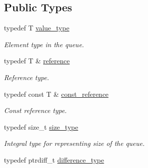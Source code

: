 \subsection*{Public Types}
\begin{DoxyCompactItemize}
\item 
\hypertarget{classtbb_1_1strict__ppl_1_1concurrent__queue_aeeee93a7ac2eecc80bbf3e857e900538}{}typedef T \hyperlink{classtbb_1_1strict__ppl_1_1concurrent__queue_aeeee93a7ac2eecc80bbf3e857e900538}{value\+\_\+type}\label{classtbb_1_1strict__ppl_1_1concurrent__queue_aeeee93a7ac2eecc80bbf3e857e900538}

\begin{DoxyCompactList}\small\item\em Element type in the queue. \end{DoxyCompactList}\item 
\hypertarget{classtbb_1_1strict__ppl_1_1concurrent__queue_ab26ddf11b15d61ac87e6c1ae67af92a2}{}typedef T \& \hyperlink{classtbb_1_1strict__ppl_1_1concurrent__queue_ab26ddf11b15d61ac87e6c1ae67af92a2}{reference}\label{classtbb_1_1strict__ppl_1_1concurrent__queue_ab26ddf11b15d61ac87e6c1ae67af92a2}

\begin{DoxyCompactList}\small\item\em Reference type. \end{DoxyCompactList}\item 
\hypertarget{classtbb_1_1strict__ppl_1_1concurrent__queue_a478c2b7f763b2e821e01cc14e13baf4c}{}typedef const T \& \hyperlink{classtbb_1_1strict__ppl_1_1concurrent__queue_a478c2b7f763b2e821e01cc14e13baf4c}{const\+\_\+reference}\label{classtbb_1_1strict__ppl_1_1concurrent__queue_a478c2b7f763b2e821e01cc14e13baf4c}

\begin{DoxyCompactList}\small\item\em Const reference type. \end{DoxyCompactList}\item 
\hypertarget{classtbb_1_1strict__ppl_1_1concurrent__queue_a9f883e49afea16293ba92da779981bb8}{}typedef size\+\_\+t \hyperlink{classtbb_1_1strict__ppl_1_1concurrent__queue_a9f883e49afea16293ba92da779981bb8}{size\+\_\+type}\label{classtbb_1_1strict__ppl_1_1concurrent__queue_a9f883e49afea16293ba92da779981bb8}

\begin{DoxyCompactList}\small\item\em Integral type for representing size of the queue. \end{DoxyCompactList}\item 
\hypertarget{classtbb_1_1strict__ppl_1_1concurrent__queue_a63b42d83a9ed13fc6741e0b4388b0e96}{}typedef ptrdiff\+\_\+t \hyperlink{classtbb_1_1strict__ppl_1_1concurrent__queue_a63b42d83a9ed13fc6741e0b4388b0e96}{difference\+\_\+type}\label{classtbb_1_1strict__ppl_1_1concurrent__queue_a63b42d83a9ed13fc6741e0b4388b0e96}


\end{DoxyCompactItemize}
